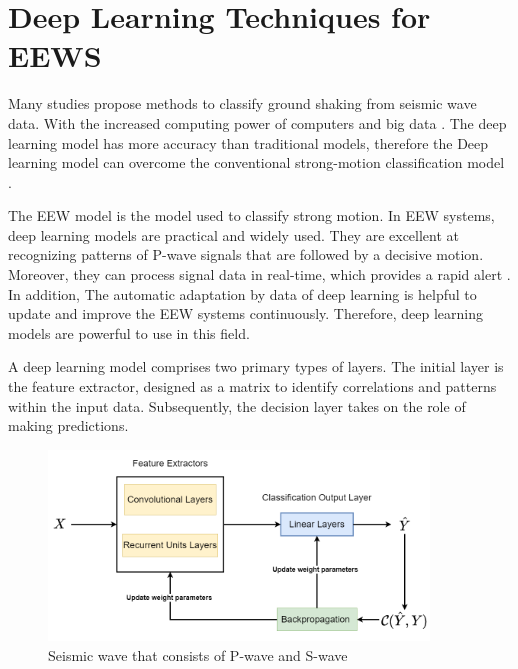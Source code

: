 
\section{Deep Learning Techniques for EEWS}\label{sec:DL-EEWS}
Many studies propose methods to classify ground shaking from seismic wave data. With the increased computing power of computers and big data \cite{mousavi2019stanford}. The deep learning model has more accuracy than traditional models, therefore the Deep learning model can overcome the conventional strong-motion classification model \cite{mousavi2020machine}.

The EEW model is the model used to classify strong motion. In EEW systems, deep learning models are practical and widely used. They are excellent at recognizing patterns of P-wave signals that are followed by a decisive motion. Moreover, they can process signal data in real-time, which provides a rapid alert \cite{li2018machine}. In addition, The automatic adaptation by data of deep learning is helpful to update and improve the EEW systems continuously. Therefore, deep learning models are powerful to use in this field.

A deep learning model comprises two primary types of layers. The initial layer is the feature extractor, designed as a matrix to identify correlations and patterns within the input data. Subsequently, the decision layer takes on the role of making predictions. 

\begin{figure}[ht]
    \centering
    \includegraphics[width=0.9\textwidth]{img/ann.png}
    \caption{Seismic wave that consists of P-wave and S-wave}
    \label{fig:ann}
\end{figure}


